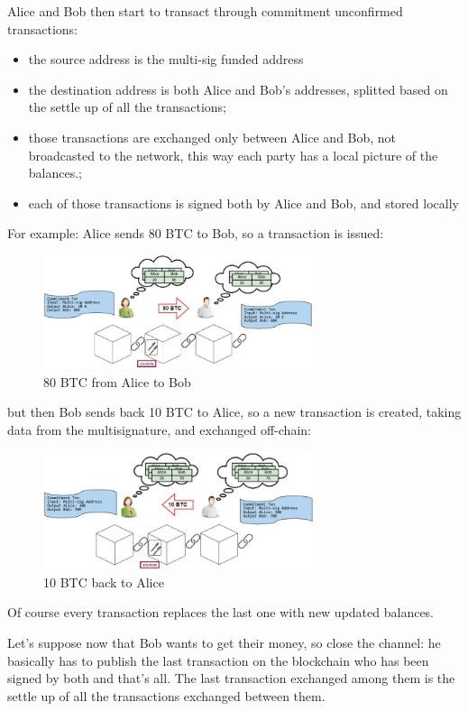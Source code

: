 Alice and Bob then start to transact through commitment unconfirmed transactions:
\begin{itemize}
    \item the source address is the multi-sig funded address
    \item the destination address is both Alice and Bob's addresses, splitted based on the settle up of all the transactions;
    \item those transactions are exchanged only between Alice and Bob, not broadcasted to the network, this way each party has a local picture of the balances.;
    \item each of those transactions is signed both by Alice and Bob, and stored locally
\end{itemize}
For example: Alice sends 80 BTC to Bob, so a transaction is issued:
\begin{figure}[H]
    \centering
    \includegraphics[width=300px]{images/10_Scaling_blockchain/01.png}
    \caption{80 BTC from Alice to Bob}
\end{figure}
but then Bob sends back 10 BTC to Alice, so a new transaction is created, taking data from the multisignature, and exchanged off-chain:
\begin{figure}[H]
    \centering
    \includegraphics[width=300px]{images/10_Scaling_blockchain/02.png}
    \caption{10 BTC back to Alice}
\end{figure}
Of course every transaction replaces the last one with new updated balances.

Let's suppose now that Bob wants to get their money, so close the channel: he basically has to publish the last transaction on the blockchain who has been signed by both and that's all.
The last transaction exchanged among them is the settle up of all the transactions exchanged between them.

